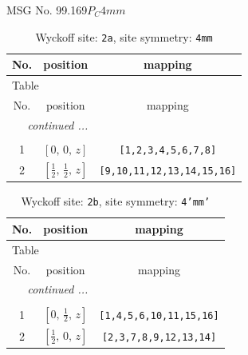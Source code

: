 \documentclass[fleqn,8pt]{jsarticle}
\begin{document}
\setcounter{MaxMatrixCols}{32}

\renewcommand{\tablename}{Table~}
\renewcommand{\figurename}{Figure~}
\begin{center}
\LARGE
MSG No. 99.169\quad$P_{C}4mm$
\end{center}
\renewcommand{\arraystretch}{1.2}
\begin{longtable}{ccc}
\caption{Wyckoff site: {\tt 2a}, site symmetry: {\tt 4mm}}
 \\
 \hline \hline
No. & position & mapping \\ \hline \endfirsthead

\multicolumn{2}{l}{\tablename\ \thetable{}} \\
 \hline \hline
No. & position & mapping \\ \hline \endhead

 \hline \hline
\multicolumn{2}{r}{\footnotesize\it continued ...} \\ \endfoot

 \hline \hline
\multicolumn{2}{r}{} \\ \endlastfoot

1 & $\left[ 0,\, 0,\, z \right]$ & {\tt [1,2,3,4,5,6,7,8]} \\ \hline
2 & $\left[ \frac{1}{2},\, \frac{1}{2},\, z \right]$ & {\tt [9,10,11,12,13,14,15,16]} \\
\end{longtable}
\renewcommand{\arraystretch}{1.2}
\begin{longtable}{ccc}
\caption{Wyckoff site: {\tt 2b}, site symmetry: {\tt 4'mm'}}
 \\
 \hline \hline
No. & position & mapping \\ \hline \endfirsthead

\multicolumn{2}{l}{\tablename\ \thetable{}} \\
 \hline \hline
No. & position & mapping \\ \hline \endhead

 \hline \hline
\multicolumn{2}{r}{\footnotesize\it continued ...} \\ \endfoot

 \hline \hline
\multicolumn{2}{r}{} \\ \endlastfoot

1 & $\left[ 0,\, \frac{1}{2},\, z \right]$ & {\tt [1,4,5,6,10,11,15,16]} \\ \hline
2 & $\left[ \frac{1}{2},\, 0,\, z \right]$ & {\tt [2,3,7,8,9,12,13,14]} \\
\end{longtable}
\end{document}
